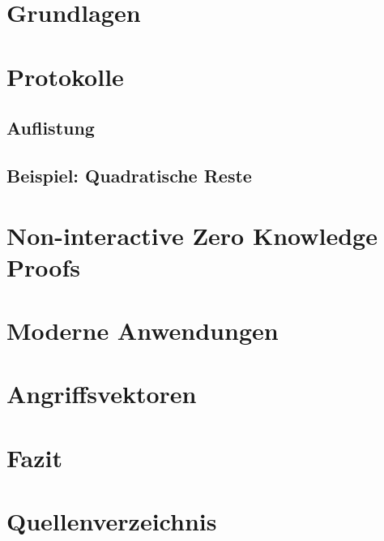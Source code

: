 \documentclass {article}
\begin{document}
\section{Grundlagen}
\section{Protokolle}
\subsection{Auflistung}
\subsection{Beispiel: Quadratische Reste}
\section{Non-interactive Zero Knowledge Proofs}
\section{Moderne Anwendungen}
\section{Angriffsvektoren}
\section{Fazit}
\section{Quellenverzeichnis}
\end{document}
